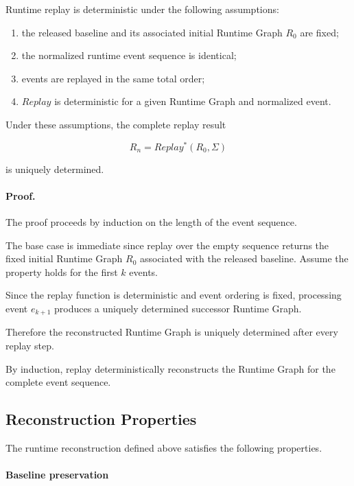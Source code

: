 \documentclass[10pt]{article}
\begin{document}
Runtime replay is deterministic under the following assumptions:

\begin{enumerate}
	\item the released baseline and its associated initial Runtime Graph $R_0$
	are fixed;
	\item the normalized runtime event sequence is identical;
	\item events are replayed in the same total order;
	\item $Replay$ is deterministic for a given Runtime Graph and normalized
	event.
\end{enumerate}

Under these assumptions, the complete replay result

\begin{equation}
	R_n
	=
	Replay^*(R_0,\Sigma)
	\label{eq:runtime_complete_replay}
\end{equation}

is uniquely determined.

\paragraph*{Proof.}

The proof proceeds by induction on the length of the event sequence.

The base case is immediate since replay over the empty sequence returns the
fixed initial Runtime Graph $R_0$ associated with the released baseline.
Assume the property holds for the first $k$ events.

Since the replay function is deterministic and event ordering is fixed, processing event $e_{k+1}$ produces a uniquely determined successor Runtime Graph.

Therefore the reconstructed Runtime Graph is uniquely determined after every replay step.

By induction, replay deterministically reconstructs the Runtime Graph for the complete event sequence.

\subsection{Reconstruction Properties}
\label{appendix:runtime_properties}

The runtime reconstruction defined above satisfies the following properties.

\paragraph*{Baseline preservation}
\end{document}
